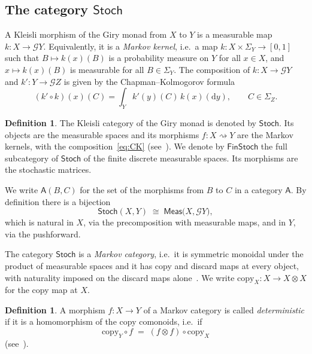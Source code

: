 \documentclass[11pt,a4paper]{article}
\theoremstyle{plain}
\theoremstyle{definition}
\newtheorem{definition}[theorem]{Definition}
\theoremstyle{remark}
\newcommand{\cat}[1]{\mathsf{#1}}
\newcommand{\Meas}{\cat{Meas}}
\newcommand{\Stoch}{\cat{Stoch}}
\newcommand{\FinStoch}{\cat{FinStoch}}
\newcommand{\G}{\mathcal{G}}
\begin{document}
\subsection{The category \texorpdfstring{$\Stoch$}{Stoch}}

A Kleisli morphism of the Giry monad from $X$ to $Y$ is a measurable map
$k \colon X\to\G Y$. Equivalently, it is a \emph{Markov kernel}, i.e.\ a map
$k \colon X\times\Sigma_Y\to[0,1]$ such that $B\mapsto k(x)(B)$ is a
probability measure on $Y$ for all $x\in X$, and $x\mapsto k(x)(B)$ is
measurable for all $B\in\Sigma_Y$. The composition of $k \colon X\to\G Y$ and
$k' \colon Y\to\G Z$ is given by the Chapman--Kolmogorov formula
\begin{equation}\label{eq:CK}
(k'\circ k)(x)(C)
=
\int_Y k'(y)(C)\,k(x)(\mathrm{d}y),\qquad C\in\Sigma_Z.
\end{equation}

\begin{definition}\label{def:stoch}
The Kleisli category of the Giry monad is denoted by $\Stoch$. Its objects are
the measurable spaces and its morphisms $f \colon X \rightsquigarrow Y$ are
the Markov kernels, with the composition~\eqref{eq:CK}
(see~\cite{fritz_synthetic_2020,giry_categorical_1982,perrone_markov_2024}).
We denote by $\FinStoch$ the full subcategory of $\Stoch$ of the finite
discrete measurable spaces. Its morphisms are the stochastic matrices.
\end{definition}

We write $\cat{A}(B,C)$ for the set of the morphisms from $B$ to $C$ in a
category $\cat{A}$. By definition there is a bijection
\begin{equation}\label{eq:kleisli}
\Stoch(X, Y) \;\cong\; \Meas\bigl(X, \G Y\bigr),
\end{equation}
which is natural in $X$, via the precomposition with measurable maps, and in
$Y$, via the pushforward.

The category $\Stoch$ is a \emph{Markov category}, i.e.\ it is symmetric
monoidal under the product of measurable spaces and it has copy and discard
maps at every object, with naturality imposed on the discard maps
alone~\cite[Def.~2.1]{fritz_synthetic_2020}. We write
$\mathrm{copy}_{X} \colon X \to X \otimes X$ for the copy map at $X$.

\begin{definition}\label{def:deterministic}
A morphism $f \colon X \to Y$ of a Markov category is called
\emph{deterministic} if it is a homomorphism of the copy comonoids, i.e.\ if
\[
\mathrm{copy}_{Y} \circ f \;=\; (f \otimes f) \circ \mathrm{copy}_{X}
\]
(see~\cite[Def.~10.1]{fritz_synthetic_2020}).
\end{definition}
\end{document}
